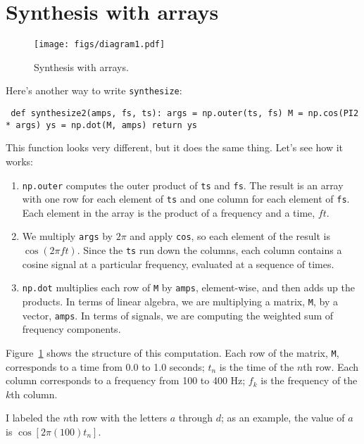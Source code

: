 \documentclass[12pt]{book} \usepackage[width=5.5in,height=8.5in, hmarginratio=3:2,vmarginratio=1:1]{geometry}
\begin{document}
\section{Synthesis with arrays} \label{synthesis} 

\begin{figure} \centerline{\texttt{[image: figs/diagram1.pdf]}} \caption{Synthesis with arrays.} \label{fig.synthesis} \end{figure} 

Here's another way to write {\tt synthesize}: 

\begin{verbatim} def synthesize2(amps, fs, ts): args = np.outer(ts, fs) M = np.cos(PI2 * args) ys = np.dot(M, amps) return ys \end{verbatim} 

This function looks very different, but it does the same thing. Let's see how it works: 

\begin{enumerate} 

\item {\tt np.outer} computes the outer product of {\tt ts} and {\tt fs}. The result is an array with one row for each element of {\tt ts} and one column for each element of {\tt fs}. Each element in the array is the product of a frequency and a time, $f t$. 

\item We multiply {\tt args} by $2 \pi$ and apply {\tt cos}, so each element of the result is $\cos (2 \pi f t)$. Since the {\tt ts} run down the columns, each column contains a cosine signal at a particular frequency, evaluated at a sequence of times. 

\item {\tt np.dot} multiplies each row of {\tt M} by {\tt amps}, element-wise, and then adds up the products. In terms of linear algebra, we are multiplying a matrix, {\tt M}, by a vector, {\tt amps}. In terms of signals, we are computing the weighted sum of frequency components. 

\end{enumerate} 

Figure~\ref{fig.synthesis} shows the structure of this computation. Each row of the matrix, {\tt M}, corresponds to a time from 0.0 to 1.0 seconds; $t_n$ is the time of the $n$th row. Each column corresponds to a frequency from 100 to 400 Hz; $f_k$ is the frequency of the $k$th column. 

I labeled the $n$th row with the letters $a$ through $d$; as an example, the value of $a$ is $\cos [2 \pi (100) t_n]$. 
\end{document}
